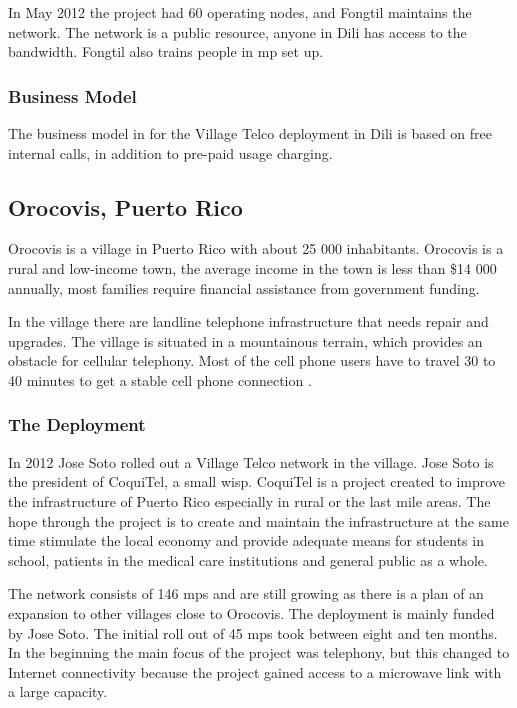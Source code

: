 In May 2012 the project had 60 operating nodes, and Fongtil maintains the network. The network is a public resource, anyone in Dili has access to the bandwidth. Fongtil also trains people in \gls{mp} set up. 


\subsubsection{Business Model}
The business model in for the Village Telco deployment in Dili is based on free internal calls, in addition to pre-paid usage charging.  

\subsection{Orocovis, Puerto Rico}
Orocovis is a village in Puerto Rico with about 25 000 inhabitants. Orocovis is a rural and low-income town, the average income in the town is less than \$14 000 annually, most families require financial assistance from government funding.   

In the village there are landline telephone infrastructure that needs repair and upgrades. The village is situated in a mountainous terrain, which provides an obstacle for cellular telephony. Most of the cell phone users have to travel 30 to 40 minutes to get a stable cell phone connection \cite{vt_puerto_rico, soto}. 

\subsubsection{The Deployment}
In 2012 Jose Soto rolled out a Village Telco network in the village. Jose Soto is the president of CoquiTel, a small \gls{wisp}. CoquiTel is a project created to improve the infrastructure of Puerto Rico especially in rural or the last mile areas. The hope through the project is to create and maintain the infrastructure at the same time stimulate the local economy and provide adequate means for students in school, patients in the medical care institutions and general public as a whole.  

The network consists of 146 \glspl{mp} and are still growing as there is a plan of an expansion to other villages close to Orocovis. The deployment is mainly funded by Jose Soto\cite{vt_puerto_rico}. The initial roll out of 45 \glspl{mp} took between eight and ten months. In the beginning the main focus of the project was telephony, but this changed to Internet connectivity because the project gained access to a microwave link with a large capacity. 

